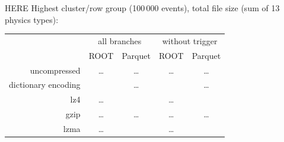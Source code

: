 \documentclass[aspectratio=169]{beamer}
\begin{document}
\begin{frame}{HERE}
\vspace{0.5 cm}
Highest cluster/row group (100\,000 events), total file size (sum of 13 physics types):

\begin{center}
\begin{tabular}{r c c | c c}
                    & \multicolumn{2}{c}{all branches} & \multicolumn{2}{c}{without trigger} \\
                    & ROOT & Parquet & ROOT & Parquet \\\hline
uncompressed        & \ldots & \ldots & \ldots & \ldots \\
dictionary encoding & & \ldots & & \ldots \\
lz4                 & \ldots & & \ldots & \\
gzip                & \ldots & \ldots & \ldots & \ldots \\
lzma                & \ldots & & \ldots & \\
\end{tabular}
\end{center}
\end{frame}
\end{document}
